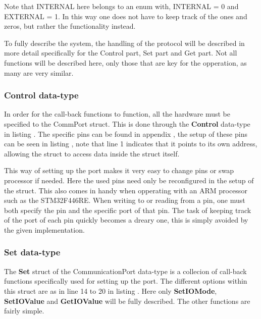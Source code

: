 Note that INTERNAL here belongs to an enum with, INTERNAL = 0 and EXTERNAL = 1. In this way one does not have to keep track of the ones and zeros, but rather the functionality instead.

To fully describe the system, the handling of the protocol will be described in more detail specifically for the Control part, Set part and Get part. Not all functions will be described here, only those that are key for the opperation, as many are very similar.

\subsubsection*{Control data-type}
In order for the call-back functions to function, all the hardware must be specified to the CommPort struct. This is done through the \textbf{Control} data-type in listing . The specific pins can be found in appendix , the setup of these pins can be seen in listing , note that line 1 indicates that it points to its own address, allowing the struct to access data inside the struct itself.



This way of setting up the port makes it very easy to change pins or swap processor if needed. Here the used pins need only be reconfigured in the setup of the struct. This also comes in handy when opperating with an ARM processor such as the STM32F446RE. When writing to or reading from a pin, one must both specify the pin and the specific port of that pin. The task of keeping track of the port of each pin quickly becomes a dreary one, this is simply avoided by the given implementation.


\subsubsection*{Set data-type}
The \textbf{Set} struct of the CommunicationPort data-type is a collecion of call-back functions specifically used for setting up the port. The different options within this struct are as in line 14 to 20 in listing . Here only \textbf{SetIOMode}, \textbf{SetIOValue} and \textbf{GetIOValue} will be fully described. The other functions are fairly simple.

